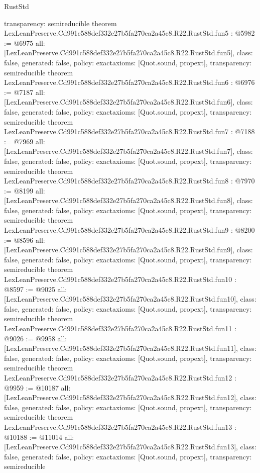 \begin{lexlean}{RustStd}
\begin{coremodule}
{  transparency: semireducible
}
theorem LexLeanPreserve.Cd991c588def332e27b5fa270ca2a45c8.R22.RustStd.fun5 : @5982 := @6975 {
  all: [LexLeanPreserve.Cd991c588def332e27b5fa270ca2a45c8.R22.RustStd.fun5],
  class: false,
  generated: false,
  policy: exact{axioms: [Quot.sound, propext]},
  transparency: semireducible
}
theorem LexLeanPreserve.Cd991c588def332e27b5fa270ca2a45c8.R22.RustStd.fun6 : @6976 := @7187 {
  all: [LexLeanPreserve.Cd991c588def332e27b5fa270ca2a45c8.R22.RustStd.fun6],
  class: false,
  generated: false,
  policy: exact{axioms: [Quot.sound, propext]},
  transparency: semireducible
}
theorem LexLeanPreserve.Cd991c588def332e27b5fa270ca2a45c8.R22.RustStd.fun7 : @7188 := @7969 {
  all: [LexLeanPreserve.Cd991c588def332e27b5fa270ca2a45c8.R22.RustStd.fun7],
  class: false,
  generated: false,
  policy: exact{axioms: [Quot.sound, propext]},
  transparency: semireducible
}
theorem LexLeanPreserve.Cd991c588def332e27b5fa270ca2a45c8.R22.RustStd.fun8 : @7970 := @8199 {
  all: [LexLeanPreserve.Cd991c588def332e27b5fa270ca2a45c8.R22.RustStd.fun8],
  class: false,
  generated: false,
  policy: exact{axioms: [Quot.sound, propext]},
  transparency: semireducible
}
theorem LexLeanPreserve.Cd991c588def332e27b5fa270ca2a45c8.R22.RustStd.fun9 : @8200 := @8596 {
  all: [LexLeanPreserve.Cd991c588def332e27b5fa270ca2a45c8.R22.RustStd.fun9],
  class: false,
  generated: false,
  policy: exact{axioms: [Quot.sound, propext]},
  transparency: semireducible
}
theorem LexLeanPreserve.Cd991c588def332e27b5fa270ca2a45c8.R22.RustStd.fun10 : @8597 := @9025 {
  all: [LexLeanPreserve.Cd991c588def332e27b5fa270ca2a45c8.R22.RustStd.fun10],
  class: false,
  generated: false,
  policy: exact{axioms: [Quot.sound, propext]},
  transparency: semireducible
}
theorem LexLeanPreserve.Cd991c588def332e27b5fa270ca2a45c8.R22.RustStd.fun11 : @9026 := @9958 {
  all: [LexLeanPreserve.Cd991c588def332e27b5fa270ca2a45c8.R22.RustStd.fun11],
  class: false,
  generated: false,
  policy: exact{axioms: [Quot.sound, propext]},
  transparency: semireducible
}
theorem LexLeanPreserve.Cd991c588def332e27b5fa270ca2a45c8.R22.RustStd.fun12 : @9959 := @10187 {
  all: [LexLeanPreserve.Cd991c588def332e27b5fa270ca2a45c8.R22.RustStd.fun12],
  class: false,
  generated: false,
  policy: exact{axioms: [Quot.sound, propext]},
  transparency: semireducible
}
theorem LexLeanPreserve.Cd991c588def332e27b5fa270ca2a45c8.R22.RustStd.fun13 : @10188 := @11014 {
  all: [LexLeanPreserve.Cd991c588def332e27b5fa270ca2a45c8.R22.RustStd.fun13],
  class: false,
  generated: false,
  policy: exact{axioms: [Quot.sound, propext]},
  transparency: semireducible
}
\end{coremodule}
\end{lexlean}
